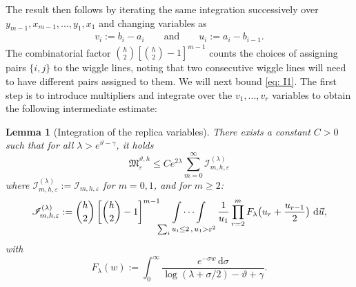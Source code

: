 \documentclass[a4paper,reqno,11pt]{amsart}
\makeatletter
\renewenvironment{proof}[1][\proofname]{\par
\pushQED{\qed}%
\normalfont \topsep4\p@\@plus4\p@\relax
\trivlist
\item[\hskip\labelsep
\bfseries
#1\@addpunct{.}]\ignorespaces
}{%
\popQED\endtrivlist\@endpefalse
}
\numberwithin{equation}{section}
\theoremstyle{mytheorem}
\newtheorem{lemma}[theorem]{Lemma}
\newcommand{\gl}{\lambda}
\newcommand{\gs}{\sigma}
\renewcommand{\epsilon}{\varepsilon}
\renewcommand{\theta}{\vartheta}
\newcommand\mI{\mathscr{I}}
\newcommand\dd{\mathrm{d}}
\makeatother
\begin{document}
{\begin{proof}
The result then follows by iterating the same integration successively over 
$y_{m-1}, x_{m-1},...,y_1, x_1$ and changing variables as
\begin{align*}
v_i:= b_i-a_i \qquad \text{and} \qquad u_i:= a_i-b_{i-1}.
\end{align*}
The combinatorial factor $ {h \choose 2} \left[ {h\choose 2} -1 \right]^{m-1}$ counts the choices of 
assigning pairs $\{i,j\}$ to the wiggle lines, noting that two consecutive wiggle lines will need to 
have different pairs assigned to them.
\end{proof}
We will next bound \eqref{eq: I1}. The first step is to introduce multipliers and integrate
over the $v_1,...,v_r$ variables to obtain the following intermediate estimate:

\begin{lemma}[Integration of the replica variables]\label{technical1}
There exists a constant $C>0$ such that for all $\lambda>e^{\theta-\gamma}$, it holds
\begin{equation}\label{eq: integration of the replica variables}
    \mathfrak{M}_\epsilon^{\theta,h} \le 
    C e^{2\gl} \sum_{m=0}^\infty  \mI^{(\lambda)}_{m,h,\epsilon}
\end{equation}
where $\mI^{(\lambda)}_{m,h,\epsilon}:=\mI_{m,h,\epsilon}$ for $m=0,1$, and for $m\ge 2$:
\begin{equation}\label{eq: I2}
    \mI^{(\lambda)}_{m,h,\epsilon} := {h \choose 2} \left[ {h\choose 2} -1 \right]^{m-1}
    \idotsint\limits_{\sum_i u_i \le 2\,,\, u_1>\epsilon^2}
    \frac{1}{u_1}
    \prod^m_{r=2}F_\gl \big(u_r+ \frac{u_{r-1}}{2} \big) \,\, \dd\vec u , 
\end{equation}
with
\begin{equation}\label{G}
F_\gl(w):=
\int^\infty_0\frac{ e^{- \gs w} \, \dd \sigma}{\log(\gl+\gs/2)-\theta+\gamma}.
\end{equation}



\end{lemma}}
\end{document}
